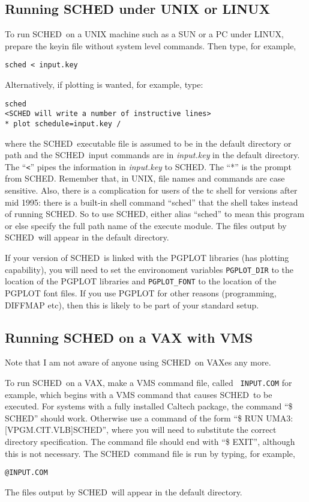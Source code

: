 \documentclass{report}
\newcommand{\sched}{{\sc SCHED}}
\newcommand{\schedb}{{\sc SCHED~}}
\begin{document}
\subsection{\label{SSEC:RUNUNIX}Running SCHED under UNIX or LINUX}

To run \schedb on a UNIX machine such as a SUN or a PC under LINUX,
prepare the keyin file without system level commands.  Then type, for
example,
\begin{verbatim}
sched < input.key
\end{verbatim}
Alternatively, if plotting is wanted, for example, type:
\begin{verbatim}
sched
<SCHED will write a number of instructive lines>
* plot schedule=input.key /
\end{verbatim}
where the \schedb executable file is assumed to be in the default
directory or path and the \schedb input commands are in {\sl input.key}
in the default directory. The ``{\tt <}'' pipes the information in
{\sl input.key} to \sched.  The ``*'' is the prompt from \sched.
Remember that, in UNIX, file names and
commands are case sensitive.  Also, there is a complication for users
of the tc shell for versions after mid 1995: there is a built-in shell
command ``sched'' that the shell takes instead of running {\sc
SCHED}. So to use \sched, either alias ``sched'' to mean this
program or else specify the full path name of the execute module. The
files output by \schedb will appear in the default directory.

If your version of \schedb is linked with the {\sc PGPLOT} libraries
(has plotting capability), you will need
to set the environoment variables {\tt PGPLOT\_DIR} to the location of
the {\sc PGPLOT} libraries and {\tt PGPLOT\_FONT} to the location of
the {\sc PGPLOT} font files.  If you use {\sc PGPLOT} for other
reasons (programming, DIFFMAP etc), then this is likely to be part
of your standard setup.

\subsection{\label{SSEC:RUNVAX}Running SCHED on a VAX with VMS}

Note that I am not aware of anyone using \schedb on VAXes any more.

To run \schedb on a VAX, make a VMS command file, called {\tt
INPUT.COM} for example, which begins with a VMS command that causes
\schedb to be executed. For systems with a fully installed Caltech
package, the command ``\$ \sched'' should work. Otherwise use a
command of the form ``\$ RUN UMA3:[VPGM.CIT.VLB]\sched'', where
you will need to substitute the correct directory specification. The
command file should end with ``\$ EXIT'', although this is not
necessary. The \schedb command file is run by typing, for example,
\begin{verbatim}
@INPUT.COM
\end{verbatim}
The files output by \schedb will appear in the default directory.
\end{document}
